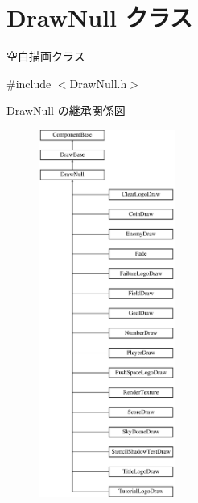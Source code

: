 \hypertarget{class_draw_null}{}\section{Draw\+Null クラス}
\label{class_draw_null}


空白描画クラス  




{\ttfamily \#include $<$Draw\+Null.\+h$>$}

Draw\+Null の継承関係図\begin{figure}[H]
\begin{center}
\leavevmode
\includegraphics[height=12.000000cm]{class_draw_null}
\end{center}
\end{figure}
